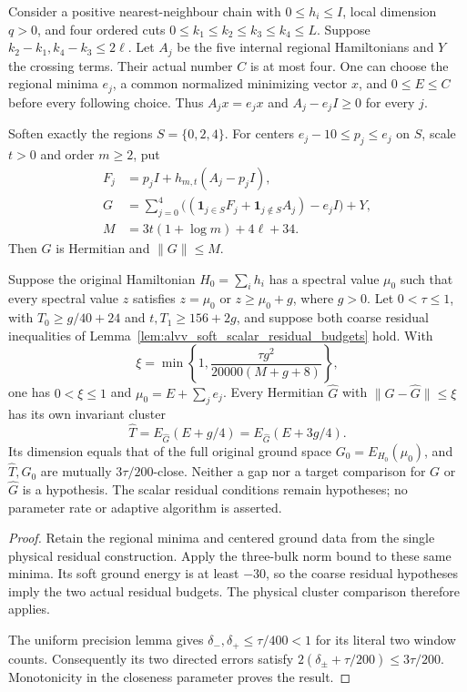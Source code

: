 \begin{lemma}
    \label{lem:alvv_five_soft_uniform_clusters}
    \leanok
    Consider a positive nearest-neighbour chain with $0\le h_i\le I$,
    local dimension $q>0$, and four ordered cuts
    $0\le k_1\le k_2\le k_3\le k_4\le L$.
    Suppose $k_2-k_1,k_4-k_3\le2\ell$. Let $A_j$ be the five
    internal regional Hamiltonians and $Y$ the crossing terms.
    Their actual number $C$ is at most four. One can choose the regional
    minima $e_j$, a common normalized minimizing vector $x$, and
    $0\le E\le C$ before every following choice. Thus
    $A_jx=e_jx$ and $A_j-e_jI\ge0$ for every $j$.

    Soften exactly the regions $S=\{0,2,4\}$. For centers
    $e_j-10\le p_j\le e_j$ on $S$, scale $t>0$ and order $m\ge2$, put
    \begin{align}
        F_j & =p_jI+h_{m,t}(A_j-p_jI),         \\
        G   & =\sum_{j=0}^4
        \bigl((\mathbf1_{j\in S}F_j+
        \mathbf1_{j\notin S}A_j)-e_jI\bigr)+Y, \\
        M   & =3t(1+\log m)+4\ell+34.
    \end{align}
    Then $G$ is Hermitian and $\|G\|\le M$.

    Suppose the original Hamiltonian $H_0=\sum_i h_i$ has a spectral
    value $\mu_0$ such that every spectral value $z$ satisfies
    $z=\mu_0$ or $z\ge\mu_0+g$, where $g>0$.
    Let $0<\tau\le1$, with
    $T_0\ge g/40+24$ and $t,T_1\ge156+2g$, and suppose both coarse
    residual inequalities of Lemma~\ref{lem:alvv_soft_scalar_residual_budgets}
    hold.
    With
    \[
        \xi=\min\left\{1,\frac{\tau g^2}{20000(M+g+8)}\right\},
    \]
    one has $0<\xi\le1$ and $\mu_0=E+\sum_j e_j$.
    Every Hermitian $\widehat G$ with $\|G-\widehat G\|\le\xi$ has
    its own invariant cluster
    \[
        \widehat T=E_{\widehat G}(E+g/4)
        =E_{\widehat G}(E+3g/4).
    \]
    Its dimension equals that of the full original ground space
    $G_0=E_{H_0}(\mu_0)$, and $\widehat T,G_0$ are mutually
    $3\tau/200$-close. Neither a gap nor a target comparison for $G$
    or $\widehat G$ is a hypothesis. The scalar residual conditions
    remain hypotheses; no parameter rate or adaptive algorithm is asserted.
\end{lemma}
\begin{proof}\leanok
    Retain the regional minima and centered ground data from the single
    physical residual construction. Apply the three-bulk norm bound to
    these same minima. Its soft ground energy is at least $-30$, so
    the coarse residual hypotheses imply the two actual residual budgets.
    The physical cluster comparison therefore applies.

    The uniform precision lemma gives $\delta_-,\delta_+\le\tau/400<1$
    for its literal two window counts. Consequently its two directed
    errors satisfy
    $2(\delta_\pm+\tau/200)\le3\tau/200$.
    Monotonicity in the closeness parameter proves the result.
\end{proof}
